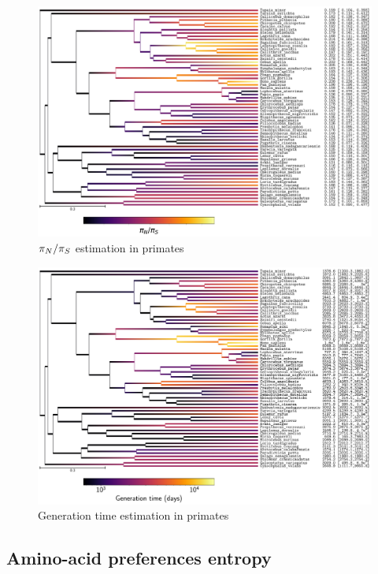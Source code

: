 \documentclass{article}
\begin{document}
	\begin{figure}[H]
		\centering
		\includegraphics[width=\linewidth, page=1]{primates/SiteMutSelBranchNe_LogpiNpiS}
		\caption[$\pnps$ estimation in primates]{$\pnps$ estimation in primates}
	\end{figure}

	\begin{figure}[H]
		\centering
		\includegraphics[width=\linewidth, page=1]{primates/SiteMutSelBranchNe_Loggeneration_time}
		\caption[Generation time estimation in primates]{Generation time estimation in primates}
	\end{figure}

	\subsection{Amino-acid preferences entropy}
\end{document}
